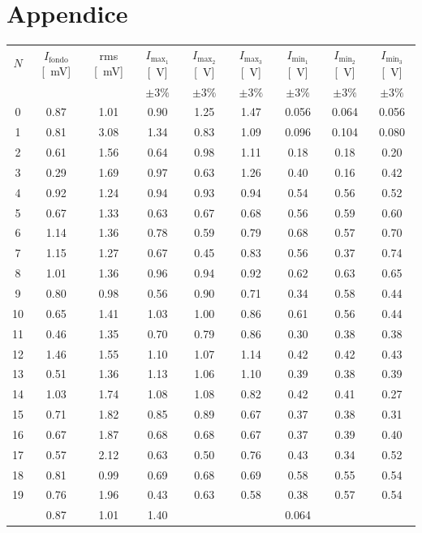 \documentclass[10pt,oneside,a4paper]{article}
\begin{document}
\section{Appendice}
\begin{center}
\label{tab:intensita}
\begin{tabular}{c|c|c|c|c|c|c|c|c}
$N$ & $I_\text{fondo}$ [\SI{}{mV}] & rms [\SI{}{mV}] & $I_{\text{max}_1}$ [\SI{}{V}] & $I_{\text{max}_2}$ [\SI{}{V}] & $I_{\text{max}_3}$ [\SI{}{V}] &  $I_{\text{min}_1}$ [\SI{}{V}] & $I_{\text{min}_2}$ [\SI{}{V}] & $I_{\text{min}_3}$ [\SI{}{V}]  \\
 &  &   &  $\pm 3\%$ & $\pm 3\%$ & $\pm 3\%$ &  $\pm 3\%$ & $\pm 3\%$ & $\pm 3\%$ \\
\hline
 0 & 0.87 & 1.01 &  0.90 & 1.25 & 1.47 &  0.056 & 0.064 & 0.056 \\
 1 & 0.81 & 3.08 &  1.34 & 0.83 & 1.09 &  0.096 & 0.104 & 0.080 \\
 2 & 0.61 & 1.56 &  0.64 & 0.98 & 1.11 &  0.18 & 0.18 & 0.20 \\
 3 & 0.29 & 1.69 &  0.97 & 0.63 & 1.26 &  0.40 & 0.16 & 0.42 \\
 4 & 0.92 & 1.24 &  0.94 & 0.93 & 0.94 &  0.54 & 0.56 & 0.52 \\
 5 & 0.67 & 1.33 &  0.63 & 0.67 & 0.68 &  0.56 & 0.59 & 0.60 \\
 6 & 1.14 & 1.36 &  0.78 & 0.59 & 0.79 &  0.68 & 0.57 & 0.70 \\
 7 & 1.15 & 1.27 &  0.67 & 0.45 & 0.83 &  0.56 & 0.37 & 0.74 \\
 8 & 1.01 & 1.36 &  0.96 & 0.94 & 0.92 &  0.62 & 0.63 & 0.65 \\
 9 & 0.80 & 0.98 &  0.56 & 0.90 & 0.71 &  0.34 & 0.58 & 0.44 \\
10 & 0.65 & 1.41 &  1.03 & 1.00 & 0.86 &  0.61 & 0.56 & 0.44 \\
11 & 0.46 & 1.35 &  0.70 & 0.79 & 0.86 &  0.30 & 0.38 & 0.38 \\
12 & 1.46 & 1.55 &  1.10 & 1.07 & 1.14 &  0.42 & 0.42 & 0.43 \\
13 & 0.51 & 1.36 &  1.13 & 1.06 & 1.10 &  0.39 & 0.38 & 0.39 \\
14 & 1.03 & 1.74 &  1.08 & 1.08 & 0.82 &  0.42 & 0.41 & 0.27 \\
15 & 0.71 & 1.82 &  0.85 & 0.89 & 0.67 &  0.37 & 0.38 & 0.31 \\
16 & 0.67 & 1.87 &  0.68 & 0.68 & 0.67 &  0.37 & 0.39 & 0.40 \\
17 & 0.57 & 2.12 &  0.63 & 0.50 & 0.76 &  0.43 & 0.34 & 0.52 \\
18 & 0.81 & 0.99 &  0.69 & 0.68 & 0.69 &  0.58 & 0.55 & 0.54 \\
19 & 0.76 & 1.96 &  0.43 & 0.63 & 0.58 &  0.38 & 0.57 & 0.54 \\
\footnotemark & 0.87 & 1.01 &  1.40 &	   &	        &  0.064 & 	 & 	\\
\hline
\end{tabular}
\end{center}
\end{document}
